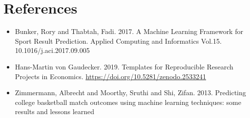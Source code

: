 \documentclass[11pt,a4paper,leqno]{article}
\begin{document}
\section{References}

\begin{itemize}
\setlength{\itemsep}{3em}
\item Bunker, Rory and Thabtah, Fadi. 2017. A Machine Learning Framework for Sport Result Prediction. Applied Computing and Informatics Vol.15. 10.1016/j.aci.2017.09.005
\item Hans-Martin von Gaudecker. 2019. Templates for Reproducible Research Projects in Economics. \url{https://doi.org/10.5281/zenodo.2533241}
\item Zimmermann, Albrecht and Moorthy, Sruthi and Shi, Zifan. 2013. Predicting college basketball match outcomes using machine learning techniques: some results and lessons learned
\end{itemize}

%

\end{document}
